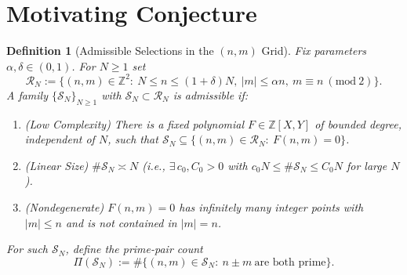 \documentclass[11pt]{article}
\theoremstyle{inline}
\theoremstyle{break}
\theoremstyle{break}
\theoremstyle{break}
\theoremstyle{break}
\theoremstyle{break}
\theoremstyle{break}
\theoremstyle{break}
\newtheorem{definition}{Definition}
\theoremstyle{inline}
\begin{document}
\appendix
{}  %

\section{Motivating Conjecture}\label{app:motivation}

\begin{definition}[Admissible Selections in the \( (n,m) \) Grid]
\label{def:admissible}
Fix parameters \( \alpha,\delta\in(0,1) \). For \( N\ge 1 \) set
\begin{equation}
\mathcal{R}_N:=\{(n,m)\in\mathbb{Z}^2:\ N\le n\le (1+\delta)N,\ |m|\le \alpha n,\ m\equiv n \ (\mathrm{mod}\ 2)\}.
\end{equation}
A family \( \{\mathcal{S}_N\}_{N\ge 1} \) with \( \mathcal{S}_N\subset\mathcal{R}_N \) is \emph{admissible} if:
\begin{enumerate}
\item[(A1)] (\emph{Low Complexity}) There is a fixed polynomial \( F\in\mathbb{Z}[X,Y] \) of bounded degree, independent of \( N \), such that
\( \mathcal{S}_N \subseteq \{(n,m)\in\mathcal{R}_N:\ F(n,m)=0\} \).
\item[(A2)] (\emph{Linear Size}) \( \#\mathcal{S}_N \asymp N \) (i.e., \( \exists\,c_0,C_0>0 \) with \( c_0 N\le \#\mathcal{S}_N\le C_0 N \) for large \( N \)).
\item[(A3)] (\emph{Nondegenerate}) \( F(n,m)=0 \) has infinitely many integer points with \( |m|\le n \) and is not contained in \( |m|=n \).
\end{enumerate}
For such \( \mathcal{S}_N \), define the prime-pair count
\begin{equation}
\Pi(\mathcal{S}_N):=\#\{(n,m)\in\mathcal{S}_N:\ n\pm m\ \text{are both prime}\}.
\end{equation}
\end{definition}
\end{document}
